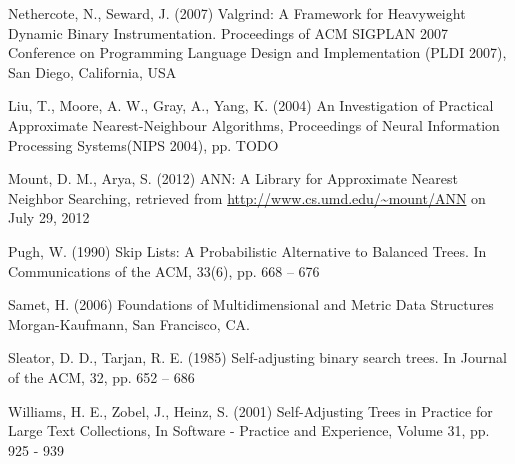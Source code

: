 \documentclass[mcs]{scsthesis}
\begin{document}
\begin{thebibliography}{5}
Nethercote, N., Seward, J. (2007) Valgrind: A Framework for Heavyweight Dynamic
Binary Instrumentation.  Proceedings of ACM SIGPLAN 2007 Conference on
Programming Language Design and Implementation (PLDI 2007),
San Diego, California, USA 

Liu, T., Moore, A. W., Gray, A., Yang, K. (2004) An Investigation of Practical
Approximate Nearest-Neighbour Algorithms, Proceedings of Neural Information
Processing Systems(NIPS 2004), pp. TODO  

Mount, D. M., Arya, S. (2012) ANN: A Library for Approximate Nearest Neighbor
Searching, retrieved from \url{http://www.cs.umd.edu/~mount/ANN} on July 29, 2012 

Pugh, W. (1990) Skip Lists: A Probabilistic Alternative to Balanced Trees.
In Communications of the ACM, 33(6), pp. 668 – 676

Samet, H. (2006) Foundations of Multidimensional and Metric Data Structures
Morgan-Kaufmann, San Francisco, CA.

Sleator, D. D., Tarjan, R. E. (1985) Self-adjusting binary search trees.
In Journal of the ACM, 32, pp. 652 – 686

Williams, H. E., Zobel, J., Heinz, S. (2001) Self-Adjusting Trees in Practice
for Large Text Collections, In Software - Practice and Experience,
Volume 31, pp. 925 - 939

\end{thebibliography}
\end{document}
